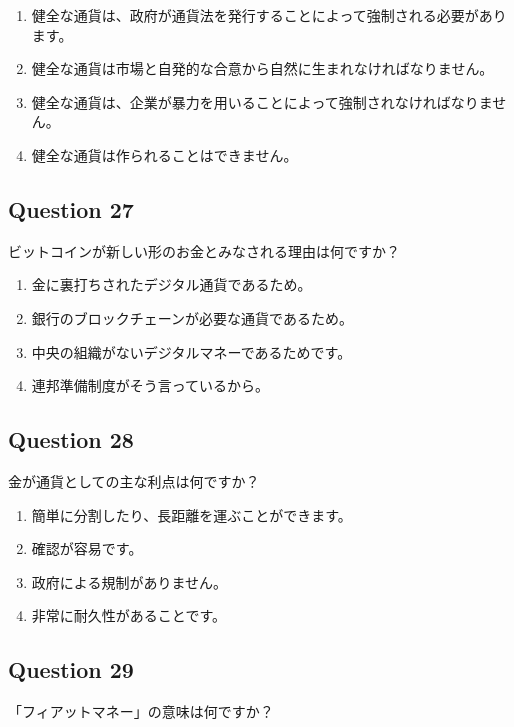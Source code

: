 \documentclass[12pt,a4paper]{article}
\begin{document}
\begin{enumerate}[label=\Alph*., leftmargin=*]
\item 健全な通貨は、政府が通貨法を発行することによって強制される必要があります。
\item 健全な通貨は市場と自発的な合意から自然に生まれなければなりません。
\item 健全な通貨は、企業が暴力を用いることによって強制されなければなりません。
\item 健全な通貨は作られることはできません。
\end{enumerate}

\bigskip


\subsection*{Question 27}
ビットコインが新しい形のお金とみなされる理由は何ですか？

\begin{enumerate}[label=\Alph*., leftmargin=*]
\item 金に裏打ちされたデジタル通貨であるため。
\item 銀行のブロックチェーンが必要な通貨であるため。
\item 中央の組織がないデジタルマネーであるためです。
\item 連邦準備制度がそう言っているから。
\end{enumerate}

\bigskip


\subsection*{Question 28}
金が通貨としての主な利点は何ですか？

\begin{enumerate}[label=\Alph*., leftmargin=*]
\item 簡単に分割したり、長距離を運ぶことができます。
\item 確認が容易です。
\item 政府による規制がありません。
\item 非常に耐久性があることです。
\end{enumerate}

\bigskip


\subsection*{Question 29}
「フィアットマネー」の意味は何ですか？
\end{document}
